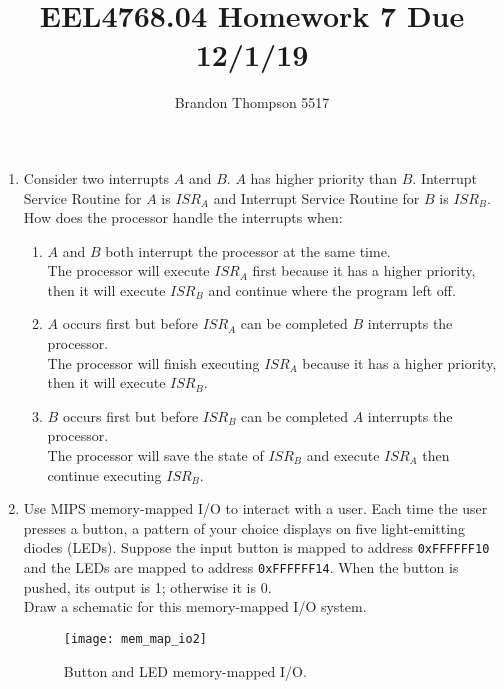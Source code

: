 \documentclass[a4paper]{article}
\begin{document}
	\title{EEL4768.04 Homework 7 Due 12/1/19}
	\author{Brandon Thompson 5517}
	\maketitle

	\begin{enumerate}
		\item Consider two interrupts $A$ and $B$. $A$ has higher priority than $B$. Interrupt
			Service Routine for $A$ is $ISR_{A}$ and Interrupt Service Routine for $B$ is
			$ISR_{B}$.\\
			How does the processor handle the interrupts when:
			\begin{enumerate}
				\item $A$ and $B$ both interrupt the processor at the same time.\\
					The processor will execute $ISR_A$ first because it has a
					higher priority, then it will execute $ISR_B$ and continue
					where the program left off.
				\item $A$ occurs first but before $ISR_{A}$ can be completed $B$
					interrupts the processor.\\
					The processor will finish executing $ISR_A$ because it has a
					higher priority, then it will execute $ISR_B$.
					
				\item $B$ occurs first but before $ISR_B$ can be completed $A$ interrupts
					the processor.\\
					The processor will save the state of $ISR_B$ and execute $ISR_A$ 
                                        then continue executing $ISR_B$.

			\end{enumerate}
		\item Use MIPS memory-mapped I/O to interact with a user. Each time the user presses a
			button, a pattern of your choice displays on five light-emitting diodes (LEDs).
			Suppose the input button is mapped to address \verb|0xFFFFFF10| and the LEDs
			are mapped to address \verb|0xFFFFFF14|. When the button is pushed, its
			output is 1; otherwise it is 0.\\
			Draw a schematic for this memory-mapped I/O system.
			\begin{figure}[ht!]
				\centering
				\texttt{[image: mem\_map\_io2]}
				\caption{Button and LED memory-mapped I/O.}
				\label{fig:mem_map_io2}
			\end{figure}
	\end{enumerate}
\end{document}
